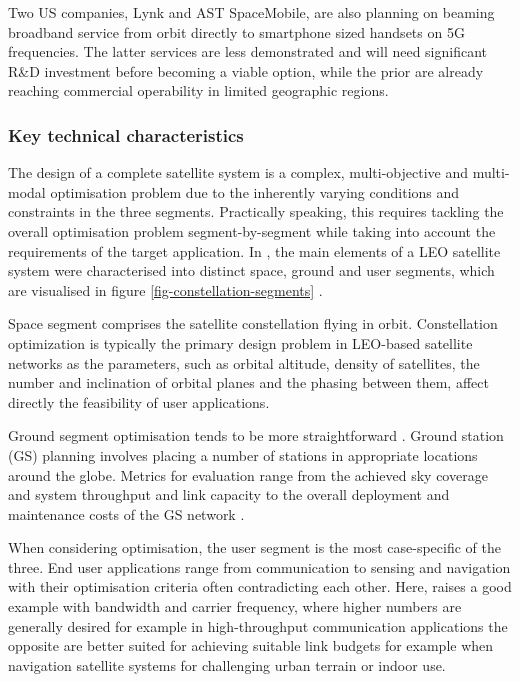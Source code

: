 \documentclass[english, 12pt, a4paper, elec, utf8, a-1b, online]{aaltothesis}
\begin{document}
Two US companies, Lynk and AST SpaceMobile, are also planning on beaming broadband service from orbit directly to smartphone sized handsets on 5G frequencies.
The latter services are less demonstrated and will need significant R\&D investment before becoming a viable option, while the prior are already reaching commercial operability in limited geographic regions.

\subsubsection{Key technical characteristics} \label{ch-constellation-characteristics}
The design of a complete satellite system is a complex, multi-objective and multi-modal optimisation problem due to the inherently varying conditions and constraints in the three segments.
Practically speaking, this requires tackling the overall optimisation problem segment-by-segment while taking into account the requirements of the target application.
In , the main elements of a LEO satellite system were characterised into distinct space, ground and user segments, which are visualised in figure \ref{fig-constellation-segments} \cite{celikbilek2022survey}.

Space segment comprises the satellite constellation flying in orbit.
Constellation optimization is typically the primary design problem in LEO-based satellite networks as the parameters, such as orbital altitude, density of satellites, the number and inclination of orbital planes and the phasing between them, affect directly the feasibility of user applications.%

Ground segment optimisation tends to be more straightforward .
Ground station (GS) planning involves placing a number of stations in appropriate locations around the globe.
Metrics for evaluation range from the achieved sky coverage and system throughput and link capacity to the overall deployment and maintenance costs of the GS network \cite{celikbilek2022survey}.

When considering optimisation, the user segment is the most case-specific of the three.
End user applications range from communication to sensing and navigation with their optimisation criteria often contradicting each other.
Here, \cite{celikbilek2022survey} raises a good example with bandwidth and carrier frequency, where higher numbers are generally desired for example in high-throughput communication applications the opposite are better suited for achieving suitable link budgets for example when navigation satellite systems for challenging urban terrain or indoor use.
\end{document}
